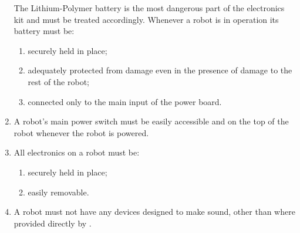\begin{enumerate}
      The Lithium-Polymer battery is the most dangerous part of the electronics
      kit and must be treated accordingly. Whenever a robot is in operation
      its battery must be:
  \begin{enumerate}
    \item securely held in place;
    \item adequately protected from damage even in the presence of damage to the
          rest of the robot;
    \item connected only to the main input of the power board.
  \end{enumerate}
\item A robot's main power switch must be easily accessible and on the top of
      the robot whenever the robot is powered.
\item All electronics on a robot must be:
  \begin{enumerate}
    \item securely held in place;
    \item easily removable.
  \end{enumerate}

\item A robot must not have any devices designed to make sound, other
      than where provided directly by \org{}.
\end{enumerate}
